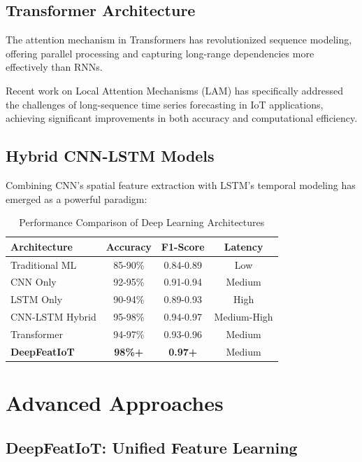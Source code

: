 \documentclass[12pt,a4paper]{article}
\begin{document}
\subsection{Transformer Architecture}

The attention mechanism in Transformers has revolutionized sequence modeling, offering parallel processing and capturing long-range dependencies more effectively than RNNs.

Recent work on Local Attention Mechanisms (LAM) has specifically addressed the challenges of long-sequence time series forecasting in IoT applications, achieving significant improvements in both accuracy and computational efficiency.

\subsection{Hybrid CNN-LSTM Models}

Combining CNN's spatial feature extraction with LSTM's temporal modeling has emerged as a powerful paradigm:

\begin{table}[H]
\centering
\caption{Performance Comparison of Deep Learning Architectures}
\begin{tabular}{lccc}
\toprule
\textbf{Architecture} & \textbf{Accuracy} & \textbf{F1-Score} & \textbf{Latency} \\
\midrule
Traditional ML & 85-90\% & 0.84-0.89 & Low \\
CNN Only & 92-95\% & 0.91-0.94 & Medium \\
LSTM Only & 90-94\% & 0.89-0.93 & High \\
CNN-LSTM Hybrid & 95-98\% & 0.94-0.97 & Medium-High \\
Transformer & 94-97\% & 0.93-0.96 & Medium \\
\textbf{DeepFeatIoT} & \textbf{98\%+} & \textbf{0.97+} & Medium \\
\bottomrule
\end{tabular}
\end{table}

\section{Advanced Approaches}

\subsection{DeepFeatIoT: Unified Feature Learning}
\end{document}

